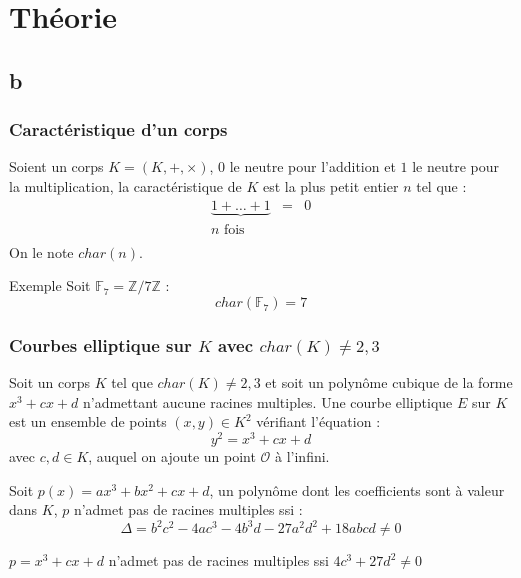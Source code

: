 \documentclass[9pt]{beamer}
\begin{document}
\section{Théorie}

\subsection*{b}

\begin{frame}
    \frametitle{Caractéristique d'un corps}
    \begin{df}
        Soient un corps $K = (K, +, \times)$, $0$ le neutre pour l'addition et $1$ le neutre pour la
        multiplication, la caractéristique de $K$ est la plus petit entier $n$ tel que :
        \[
            \begin{array}{ccc}
                \underbrace{1 + \dots + 1} & = & 0 \\
                n \mbox{ fois} & & \\
            \end{array}
        \]
        On le note $char(n)$.
    \end{df}
    \begin{exampleblock}{Exemple}
        Soit $\mathbb{F}_7 = \mathbb{Z}/7\mathbb{Z}$ : 
        \[ char(\mathbb{F}_7) = 7 \]
    \end{exampleblock}
\end{frame}

\begin{frame}
    \frametitle{Courbes elliptique sur $K$ avec $char(K) \neq 2,3$}
    \begin{df}
        Soit un corps $K$ tel que $char(K) \neq 2, 3$ et soit un polynôme cubique de la forme $x^3 +
        cx + d$ n'admettant aucune racines multiples. Une courbe elliptique $E$ sur $K$ est un
        ensemble de points $(x,y) \in K^2$ vérifiant l'équation :
        \[
            y^2 = x^3 + cx + d
        \]
        avec $c, d \in K$, auquel on ajoute un point $\mathcal{O}$ à l'infini.
    \end{df}

    \begin{thrm}
        Soit $p(x) = ax^3 + bx^2 + cx + d$, un polynôme dont les coefficients sont à valeur dans $K$, $p$ n'admet pas de
        racines multiples ssi : \[
            \Delta =  b^2c^2 - 4ac^3 - 4b^3d - 27a^2d^2 + 18abcd \neq 0
        \]
    \end{thrm}
    \begin{corol}
        $p = x^3 + cx + d$ n'admet pas de racines multiples ssi $4c^3 + 27d^2 \neq 0$
    \end{corol}
\end{frame}
\end{document}
